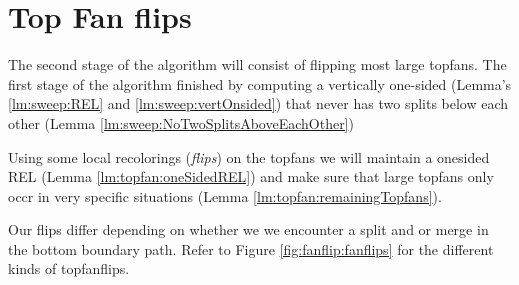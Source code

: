 
\section{Top Fan flips}
\label{s:fanflip}

The second stage of the algorithm will consist of flipping most large topfans. The first stage of the algorithm finished by computing a vertically one-sided \rel (Lemma's \ref{lm:sweep:REL} and \ref{lm:sweep:vertOnsided}) that never has two splits below each other (Lemma \ref{lm:sweep:NoTwoSplitsAboveEachOther})

Using some local recolorings (\emph{flips}) on the topfans we will maintain a onesided REL (Lemma \ref{lm:topfan:oneSidedREL}) and make sure that large topfans only occr in very specific situations (Lemma \ref{lm:topfan:remainingTopfans}).

Our flips differ depending on whether we we encounter a split and or merge in the bottom boundary path. Refer to Figure \ref{fig:fanflip:fanflips} for the different kinds of topfanflips.


